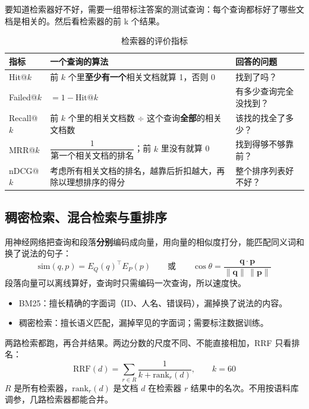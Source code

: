 要知道检索器好不好，需要一组带标注答案的测试查询：每个查询都标好了哪些文档是相关的。然后看检索器的前 k 个结果。\\
\begin{table}[htbp]
\centering
\caption{检索器的评价指标}
\label{tab:retrieval-metrics}
\begin{tabular}{p{2.2cm} p{8.3cm} p{4.5cm}}
  \toprule
  指标 & 一个查询的算法 & 回答的问题 \\
  \midrule
  Hit@$k$    & 前 $k$ 个里\textbf{至少有一个}相关文档就算 1，否则 0 & 找到了吗？ \\
  Failed@$k$ & $= 1 - \text{Hit@}k$ & 有多少查询完全没找到？ \\
  Recall@$k$ & 前 $k$ 个里的相关文档数 $\div$ 这个查询\textbf{全部}的相关文档数 & 该找的找全了多少？ \\
  MRR@$k$    & $\dfrac{1}{\text{第一个相关文档的排名}}$；前 $k$ 里没有就算 0 & 找到得够不够靠前？ \\
  nDCG@$k$   & 考虑所有相关文档的排名，越靠后折扣越大，再除以理想排序的得分 & 整个排序列表好不好？ \\
  \bottomrule
\end{tabular}
\end{table}
\subsection{稠密检索、混合检索与重排序}

用神经网络把查询和段落\textbf{分别}编码成向量，用向量的相似度打分，能匹配同义词和换了说法的句子：
\[
  \text{sim}(q, p) = E_Q(q)^{\top} E_P(p)
  \qquad \text{或} \qquad
  \cos\theta = \frac{\mathbf{q} \cdot \mathbf{p}}{\lVert \mathbf{q} \rVert \, \lVert \mathbf{p} \rVert}
\]
段落向量可以离线算好，查询时只需编码一次查询，所以速度快。

\begin{itemize}
  \item BM25：擅长精确的字面词（ID、人名、错误码），漏掉换了说法的内容。
  \item 稠密检索：擅长语义匹配，漏掉罕见的字面词；需要标注数据训练。
\end{itemize}

两路检索都跑，再合并结果。两边分数的尺度不同、不能直接相加，RRF 只看排名：
\[
  \text{RRF}(d) = \sum_{r \in R} \frac{1}{k + \text{rank}_r(d)}, \qquad k = 60
\]
$R$ 是所有检索器，$\text{rank}_r(d)$ 是文档 $d$ 在检索器 $r$ 结果中的名次。不用按语料库调参，几路检索器都能合并。

